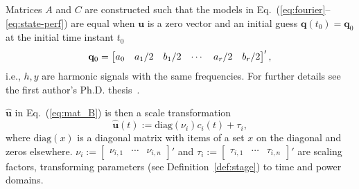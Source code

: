 \documentclass[letterpaper,10pt,conference,twoside]{IEEEtran}
\theoremstyle{definition}
\newtheorem{lem}[thm]{Lemma}
\begin{document}
{\color{black}Matrices $A$ and $C$ are constructed such that t}he %
models in Eq.~(\ref{eq:fourier}--\ref{eq:state-perf}) are equal
when $\mathbf{u}$ is a zero vector %
and an initial guess $\mathbf{q}(t_0)=\mathbf{q}_0$ at {\color{black}the} initial time instant $t_0$
  {\color{black}\begin{equation}
  {\color{black}\mathbf{q}_0=\begin{bmatrix}a_0 & a_1/2 & b_1/2 & \cdots & a_r/2 & b_r/2\end{bmatrix}',}
  \end{equation}}
i.e., $h,y$ are %
harmonic signals with the same frequencies{\color{black}. For further details see the first author's Ph.D. thesis~\cite{seewaldphdthesis}}.

$\hat{\mathbf{u}}$ in Eq.~(\ref{eq:mat_B}) is then a scale transformation
\begin{equation}
  \hat{\mathbf{u}}(t):=\mathrm{diag}(\nu_i)c_i(t)+\tau_i,
\end{equation}
where $\mathrm{diag}(x)$ is a diagonal matrix with items of a set $x$ on the diagonal and zeros elsewhere. $\nu_i:=\begin{bmatrix}\nu_{i,1}&\cdots&\nu_{i,n}\end{bmatrix}'$ and $\tau_i:=\begin{bmatrix}\tau_{i,1}&\cdots&\tau_{i,n}\end{bmatrix}'$ are scaling factors{\color{black},} %
transform{\color{black}ing} parameters %
(see Definition~\ref{def:stage}) to time and power domains.
\end{document}
